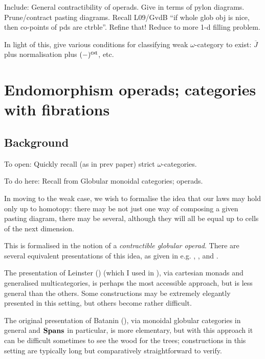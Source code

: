 \documentclass{amsart}
\newcommand{\Jbar}{\overline{J}}
\begin{document}
Include:  General contractibility of operads.  Give in terms of pylon diagrams.  Prune/contract pasting diagrams.  Recall L09/GvdB ``if whole glob obj is nice, then co-points of pds are ctrble''.  Refine that!  Reduce to more 1-d filling problem.

In light of this, give various conditions for classifying weak $\omega$-category to exist: $\Jbar$ plus normalisation plus $(-)^{\mathsf{cxt}}$, etc.

\clearpage


\section{Endomorphism operads; categories with fibrations} \label{sec:endo-operads}

\subsection{Background}

To open: Quickly recall (as in prev paper) strict $\omega$-categories.

To do here: Recall from \cite{batanin:natural-environment} Globular monoidal categories; operads.

In moving to the weak case, we wish to formalise the idea that our laws may hold only up to homotopy: there may be not just one way of composing a given pasting diagram, there may be several, although they will all be equal up to cells of the next dimension.

This is formalised in the notion of a \emph{contractible globular operad}.  There are several equivalent presentations of this idea, as given in e.g. \cite{batanin:natural-environment}, \cite{leinster:book}, and \cite{weber:operads-within}.

The presentation of Leinster (\cite{leinster:book}) (which I used in \cite{lumsdaine:tlca}), via cartesian monads and generalised multicategories, is perhaps the most accessible approach, but is less general than the others.  Some constructions may be extremely elegantly presented in this setting, but others become rather difficult.

The original presentation of Batanin (\cite{batanin:natural-environment}), via monoidal globular categories in general and $\mathbf{Spans}_{}$ in particular, is more elementary, but with this approach it can be difficult sometimes to see the wood for the trees; constructions in this setting are typically long but comparatively straightforward to verify.  
\end{document}
